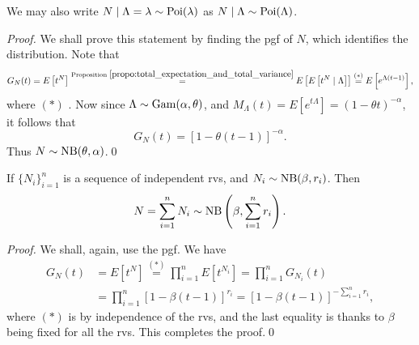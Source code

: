\documentclass[notoc,notitlepage]{tufte-book}
\begin{document}
\begin{note}
  We may also write $N \mid \Lambda = \lambda \sim \operatorname{Poi}(\lambda)$ as $N \mid \Lambda \sim \operatorname{Poi}(\Lambda)$.
\end{note}

\begin{proof}
  We shall prove this statement by finding the pgf of $N$, which identifies the distribution. Note that
  \begin{equation*}
    G_N(t) = E\left[ t^N \right] \overset{\text{Proposition }\ref{propo:total_expectation_and_total_variance}}{=} E \left[ E \left[ t^N \mid \Lambda \right] \right] \overset{(*)}{=} E \left[ e^{\Lambda (t - 1)} \right],
  \end{equation*}
  where $(*)$ . Now since $\Lambda \sim \operatorname{Gam}(\alpha, \theta)$, and $M_\Lambda(t) = E\left[e^{t \Lambda}\right] = (1 - \theta t)^{-\alpha}$, it follows that
  \begin{equation*}
    G_N(t) = [ 1 - \theta(t - 1) ]^{-\alpha}.
  \end{equation*}
  Thus $N \sim \operatorname{NB}(\theta, \alpha)$.\qed\
\end{proof}

\begin{propo}\label{propo:combining_negative_binomial_distributions}
  If $\{ N_i \}_{i = 1}^{n}$ is a sequence of independent rvs, and $N_i \sim \operatorname{NB}(\beta, r_i)$. Then
  \begin{equation*}
    N = \sum_{i=1}^{n} N_i \sim \operatorname{NB} \left( \beta, \sum_{i=1}^{n} r_i \right).
  \end{equation*}
\end{propo}

\begin{proof}
  We shall, again, use the pgf. We have
  \begin{align*}
    G_N(t) &= E \left[ t^N \right] \overset{(*)}{=} \prod_{i=1}^{n} E \left[ t^{N_i} \right] = \prod_{i=1}^{n} G_{N_i}(t) \\
           &= \prod_{i=1}^{n} [1 - \beta ( t - 1 )]^{r_i} = [ 1 - \beta ( t - 1 ) ]^{- \sum_{i=1}^{n} r_i},
  \end{align*}
  where $(*)$ is by independence of the rvs, and the last equality is thanks to $\beta$ being fixed for all the rvs. This completes the proof.\qed\
\end{proof}


\end{document}
